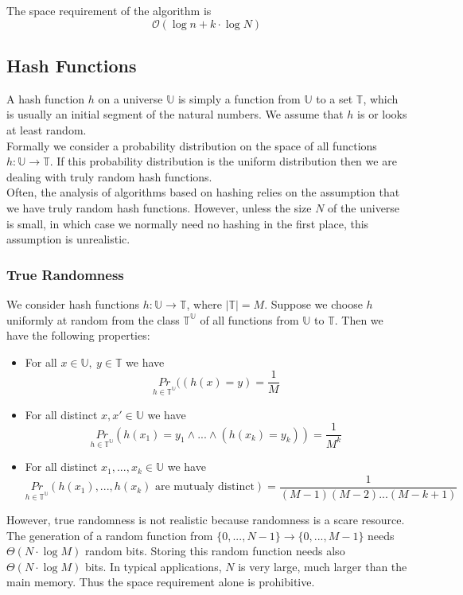 \documentclass{panikzettel}
\begin{document}
The space requirement of the algorithm is
\[
\mathcal{O}(\log n + k\cdot \log N)
\]

\subsection{Hash Functions}
A hash function $h$ on a universe $\mathbb{U}$ is simply a function from $\mathbb{U}$ to a set $\mathbb{T}$, which is usually an initial segment of the natural numbers. We assume that $h$ is or looks at least random.\\
Formally we consider a probability distribution on the space of all functions $h:\mathbb{U}\to\mathbb{T}$. If this probability distribution is the uniform distribution then we are dealing with truly random hash functions.\\
Often, the analysis of algorithms based on hashing relies on the assumption that we have truly random hash functions. However, unless the size $N$ of the universe is small, in which case we normally need no hashing in the first place, this assumption is unrealistic.

%

\subsubsection{True Randomness}
We consider hash functions $h:\mathbb{U}\to \mathbb{T}$, where $|\mathbb{T}|=M$. Suppose we choose $h$ uniformly at random from the class $\mathbb{T}^\mathbb{U}$ of all functions from $\mathbb{U}$ to $\mathbb{T}$. Then we have the following properties:
\begin{itemize}
\item For all $x\in\mathbb{U}, \ y\in \mathbb{T}$ we have
\[
\underset{h\in\mathbb{T}^\mathbb{U}}{Pr}((h(x)=y)=\frac{1}{M}
\]
\item For all distinct $x,x'\in\mathbb{U}$ we have
\[
\underset{h\in\mathbb{T}^\mathbb{U}}{Pr}(h(x_1)=y_1 \wedge ... \wedge (h(x_k)=y_k))=\frac{1}{M^k}
\]
\item For all distinct $x_1,...,x_k\in\mathbb{U}$ we have
\[
\underset{h\in\mathbb{T}^\mathbb{U}}{Pr}(h(x_1),...,h(x_k) \text{ are mutualy distinct})=\frac{1}{(M-1)(M-2)...(M-k+1)}
\]
\end{itemize}
However, true randomness is not realistic because randomness is a scare resource. The generation of a random function from $\{0,...,N-1 \} \to \{0,...,M-1 \}$ needs $\Theta(N\cdot \log M)$ random bits. Storing this random function needs also $\Theta(N\cdot \log M)$ bits. In typical applications, $N$ is very large, much larger than the main memory. Thus the space requirement alone is prohibitive.
\end{document}
